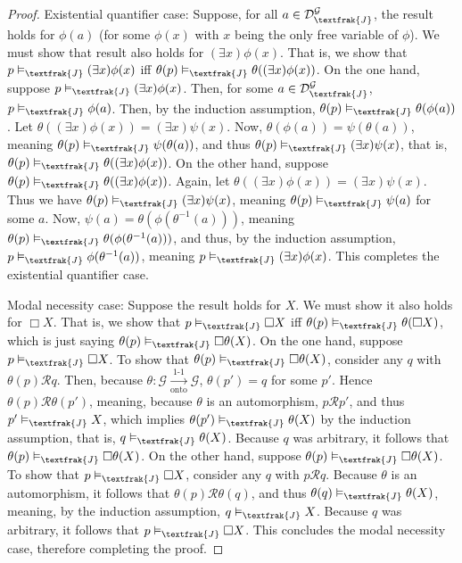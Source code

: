 \documentclass{article}
\theoremstyle{definition}
\begin{document}
\begin{proof}
Existential quantifier case: Suppose, for all $a\in\mathcal{D}^\mathcal{G}_\textfrak{J}$, 
the result holds for $\phi(a)$ (for some $\phi(x)$ with $x$ being the only free variable of $\phi$). We must show that 
result also holds for $(\exists x)\phi(x)$. That is, we show that 
$p\vDash_\textfrak{J}(\exists x)\phi(x)$ iff $\theta(p)\vDash_\textfrak{J}\theta((\exists x)\phi(x))$. On the one hand, suppose 
$p\vDash_\textfrak{J}(\exists x)\phi(x)$. Then, for some $a\in\mathcal{D}^\mathcal{G}_\textfrak{J}$, 
$p\vDash_\textfrak{J}\phi(a)$. Then, by the induction assumption, 
$\theta(p)\vDash_\textfrak{J}\theta(\phi(a))$. Let $\theta((\exists x)\phi(x))=(\exists x)\psi(x)$. 
Now, $\theta(\phi(a))=\psi(\theta(a))$, meaning $\theta(p)\vDash_\textfrak{J}\psi(\theta(a))$, and thus 
$\theta(p)\vDash_\textfrak{J}(\exists x)\psi(x)$, that is, $\theta(p)\vDash_\textfrak{J}\theta((\exists x)\phi(x))$.
On the other hand, suppose $\theta(p)\vDash_\textfrak{J}\theta((\exists x)\phi(x))$. Again, let 
$\theta((\exists x)\phi(x))=(\exists x)\psi(x)$. Thus we have 
$\theta(p)\vDash_\textfrak{J}(\exists x)\psi(x)$, meaning $\theta(p)\vDash_\textfrak{J}\psi(a)$ for some $a$. Now, 
$\psi(a)=\theta(\phi(\theta^{-1}(a)))$, meaning $\theta(p)\vDash_\textfrak{J}\theta(\phi(\theta^{-1}(a)))$, and thus, 
by the induction assumption, $p\vDash_\textfrak{J}\phi(\theta^{-1}(a))$, meaning 
$p\vDash_\textfrak{J}(\exists x)\phi(x)$. This completes the existential quantifier case.

Modal necessity case: Suppose the result holds for $X$. We must show it also holds for $\Box X$. That is, we show that 
$p\vDash_\textfrak{J}\Box X$ iff $\theta(p)\vDash_\textfrak{J}\theta(\Box X)$, which is just saying
$\theta(p)\vDash_\textfrak{J}\Box\theta(X)$. On the one hand, suppose $p\vDash_\textfrak{J}\Box X$. To show 
that $\theta(p)\vDash_\textfrak{J}\Box\theta(X)$, consider any $q$ with 
$\theta(p)\mathcal{R}q$. Then, because $\theta:\mathcal{G}\xrightarrow[\text{onto}]{\text{1-1}}\mathcal{G}$, 
$\theta(p')=q$ for some $p'$. Hence $\theta(p)\mathcal{R}\theta(p')$, meaning, because $\theta$ is an 
automorphism, $p\mathcal{R}p'$, and thus $p'\vDash_\textfrak{J} X$, which implies 
$\theta(p')\vDash_\textfrak{J}\theta(X)$ by the induction assumption, that is, 
$q\vDash_\textfrak{J}\theta(X)$. Because $q$ was arbitrary, it follows that 
$\theta(p)\vDash_\textfrak{J}\Box\theta(X)$. 
On the other hand, suppose $\theta(p)\vDash_\textfrak{J}\Box\theta(X)$. To show that 
$p\vDash_\textfrak{J}\Box X$, consider any $q$ with $p\mathcal{R}q$. Because $\theta$ is an 
automorphism, it follows that $\theta(p)\mathcal{R}\theta(q)$, and thus
$\theta(q)\vDash_\textfrak{J}\theta(X)$, meaning, by the induction assumption, 
$q\vDash_\textfrak{J} X$. Because $q$ was arbitrary, it follows that 
$p\vDash_\textfrak{J}\Box X$. This concludes the modal necessity case, therefore completing the proof.

\end{proof}
\end{document}
